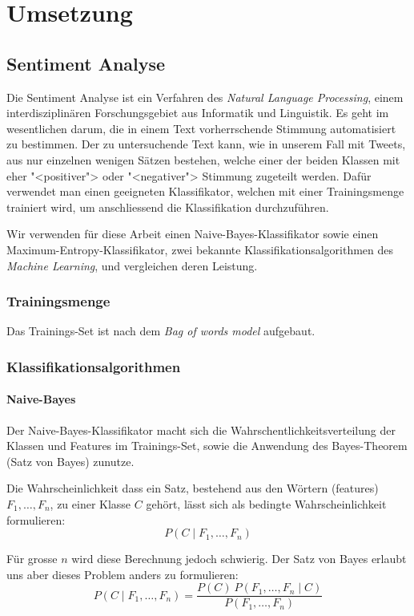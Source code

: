 \documentclass[12pt, oneside]{report}   	%
\begin{document}
\chapter{Umsetzung}

\section{Sentiment Analyse}
Die Sentiment Analyse ist ein Verfahren des \emph{Natural Language Processing}, einem interdisziplinären Forschungsgebiet aus Informatik und Linguistik.
Es geht im wesentlichen darum, die in einem Text vorherrschende Stimmung automatisiert zu bestimmen. 
Der zu untersuchende Text kann, wie in unserem Fall mit Tweets, aus nur einzelnen wenigen Sätzen bestehen, welche einer der beiden Klassen mit eher "<positiver"> oder "<negativer"> Stimmung zugeteilt werden.
Dafür verwendet man einen geeigneten Klassifikator, welchen  mit einer Trainingsmenge trainiert wird, um anschliessend die Klassifikation durchzuführen. 

Wir verwenden für diese Arbeit einen Naive-Bayes-Klassifikator sowie einen Maximum-Entropy-Klassifikator, zwei bekannte Klassifikationsalgorithmen des \emph{Machine Learning}, und vergleichen deren Leistung.


\subsection{Trainingsmenge}
Das Trainings-Set ist nach dem \emph{Bag of words model} aufgebaut.

\subsection{Klassifikationsalgorithmen}
\subsubsection{Naive-Bayes}

Der Naive-Bayes-Klassifikator macht sich die Wahrschentlichkeitsverteilung der Klassen und Features im Trainings-Set, sowie die Anwendung des Bayes-Theorem (Satz von Bayes) zunutze.

Die Wahrscheinlichkeit dass ein Satz, bestehend aus den Wörtern (features) $F_1,\dots,F_n$, zu einer Klasse $C$ gehört, lässt sich als bedingte Wahrscheinlichkeit formulieren:
$$ P(C \mid F_1,\dots,F_n)$$

Für grosse $n$ wird diese Berechnung jedoch schwierig. Der Satz von Bayes erlaubt uns aber dieses Problem anders zu formulieren:
$$
P(C \mid F_1,\dots,F_n) = \frac{P(C) \ P(F_1,\dots,F_n\mid C )}{P(F_1,\dots,F_n)}
$$
\end{document}
